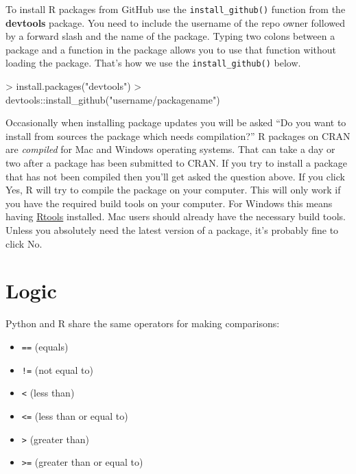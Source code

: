 \documentclass[
]{book}
\newenvironment{Shaded}{\begin{snugshade}}{\end{snugshade}}
\newcommand{\FunctionTok}[1]{\textcolor[rgb]{0.00,0.00,0.00}{#1}}
\newcommand{\NormalTok}[1]{#1}
\newcommand{\SpecialCharTok}[1]{\textcolor[rgb]{0.00,0.00,0.00}{#1}}
\newcommand{\StringTok}[1]{\textcolor[rgb]{0.31,0.60,0.02}{#1}}
\providecommand{\tightlist}{%
  \setlength{\itemsep}{0pt}\setlength{\parskip}{0pt}}
\begin{document}
To install R packages from GitHub use the \texttt{install\_github()} function from the \textbf{devtools} package. You need to include the username of the repo owner followed by a forward slash and the name of the package. Typing two colons between a package and a function in the package allows you to use that function without loading the package. That's how we use the \texttt{install\_github()} below.

\begin{Shaded}
\begin{Highlighting}[]
\SpecialCharTok{\textgreater{}} \FunctionTok{install.packages}\NormalTok{(}\StringTok{"devtools"}\NormalTok{)}
\SpecialCharTok{\textgreater{}}\NormalTok{ devtools}\SpecialCharTok{::}\FunctionTok{install\_github}\NormalTok{(}\StringTok{"username/packagename"}\NormalTok{)}
\end{Highlighting}
\end{Shaded}

Occasionally when installing package updates you will be asked ``Do you want to install from sources the package which needs compilation?'' R packages on CRAN are \emph{compiled} for Mac and Windows operating systems. That can take a day or two after a package has been submitted to CRAN. If you try to install a package that has not been compiled then you'll get asked the question above. If you click Yes, R will try to compile the package on your computer. This will only work if you have the required build tools on your computer. For Windows this means having \href{https://cran.r-project.org/bin/windows/Rtools/}{Rtools} installed. Mac users should already have the necessary build tools. Unless you absolutely need the latest version of a package, it's probably fine to click No.

\hypertarget{logic}{%
\section{Logic}\label{logic}}

Python and R share the same operators for making comparisons:

\begin{itemize}
\tightlist
\item
  \texttt{==} (equals)
\item
  \texttt{!=} (not equal to)
\item
  \texttt{\textless{}} (less than)
\item
  \texttt{\textless{}=} (less than or equal to)
\item
  \texttt{\textgreater{}} (greater than)
\item
  \texttt{\textgreater{}=} (greater than or equal to)
\end{itemize}
\end{document}
